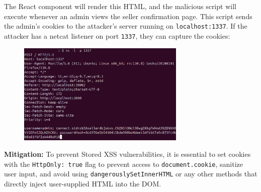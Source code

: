 \documentclass[]{article}
\begin{document}
The React component will render this HTML, and the malicious script will execute whenever an admin views the seller confirmation page. This script sends the admin's cookies to the attacker's server running on \texttt{localhost:1337}. If the attacker has a netcat listener on port \texttt{1337}, they can capture the cookies:

\begin{figure}[h]
\includegraphics[width=8cm]{images/stored_xss.eps}
\centering
\end{figure}

\textbf{Mitigation:}
To prevent Stored XSS vulnerabilities, it is essential to set cookies with the \texttt{HttpOnly: true} flag to prevent access to \texttt{document.cookie}, sanitize user input, and avoid using \texttt{dangerouslySetInnerHTML} or any other methods that directly inject user-supplied HTML into the DOM.
\end{document}
